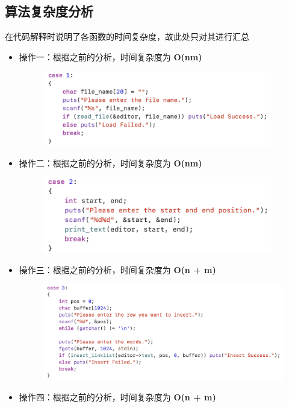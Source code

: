     \subsection{算法复杂度分析}
        \par 在代码解释时说明了各函数的时间复杂度，故此处只对其进行汇总
        \begin{itemize}
            \item 操作一：根据之前的分析，时间复杂度为 \textbf{O(nm)}
            \begin{figure}[htbp]
                \includegraphics[width = 10cm]{cs_1.png}
            \end{figure}
            \item 操作二：根据之前的分析，时间复杂度为 \textbf{O(nm)}
            \begin{figure}[htbp]
                \includegraphics[width = 10cm]{cs_2.png}
            \end{figure}
            \newpage
            \item 操作三：根据之前的分析，时间复杂度为 \textbf{O(n + m)}
            \begin{figure}[htbp]
                \includegraphics[width = 12cm]{cs_3.png}
            \end{figure}
            \item 操作四：根据之前的分析，时间复杂度为 \textbf{O(n + m)}

\end{itemize}
